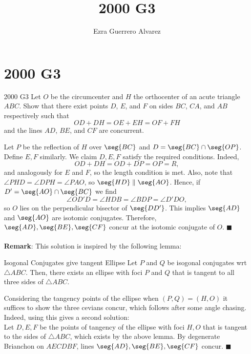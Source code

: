 \documentclass[14pt]{article}
\title{2000 G3}
\author{Ezra Guerrero Alvarez}
\begin{document}
\maketitle
	
\section*{2000 G3}

\begin{statement}{2000 G3}
	Let $O$ be the circumcenter and $H$ the orthocenter of an acute triangle $ABC$.  Show that there exist points $D$, $E$, and $F$ on sides $BC$, $CA$, and $AB$ respectively such that
	\[ OD + DH = OE + EH = OF + FH \]
	and the lines $AD$, $BE$, and $CF$ are concurrent.
\end{statement}
Let $P$ be the reflection of $H$ over $\seg{BC}$ and $D=\seg{BC}\cap\seg{OP}$. Define $E,F$ similarly. We claim $D,E,F$ satisfy the required conditions. Indeed, 
\[ OD + DH = OD + DP = OP = R, \]
and analogously for $E$ and $F$, so the length condition is met. Also, note that $\angle PHD = \angle DPH = \angle PAO$, so $\seg{HD}\parallel\seg{AO}$. Hence, if $D'=\seg{AO}\cap\seg{BC}$ we find
\[ \angle OD'D = \angle HDB = \angle BDP = \angle D'DO, \]
so $O$ lies on the perpendicular bisector of $\seg{DD'}$. This implies $\seg{AD}$ and $\seg{AO}$ are isotomic conjugates. Therefore, $\seg{AD},\seg{BE},\seg{CF}$ concur at the isotomic conjugate of $O$. $\blacksquare$\\
\\
\textbf{Remark}: This solution is inspired by the following lemma:
\begin{lemma}{Isogonal Conjugates give tangent Ellipse}
	Let $P$ and $Q$ be isogonal conjugates wrt $\triangle ABC$. Then, there exists an ellipse with foci $P$ and $Q$ that is tangent to all three sides of $\triangle ABC$.
\end{lemma}
Considering the tangency points of the ellipse when $(P,Q)=(H,O)$ it suffices to show the three cevians concur, which follows after some angle chasing.\\
Indeed, using this gives a second solution:\\
Let $D,E,F$ be the points of tangency of the ellipse with foci $H,O$ that is tangent to the sides of $\triangle ABC$, which exists by the above lemma. By degenerate Brianchon on $AECDBF$, lines $\seg{AD},\seg{BE},\seg{CF}$ concur. $\blacksquare$	
\end{document}
